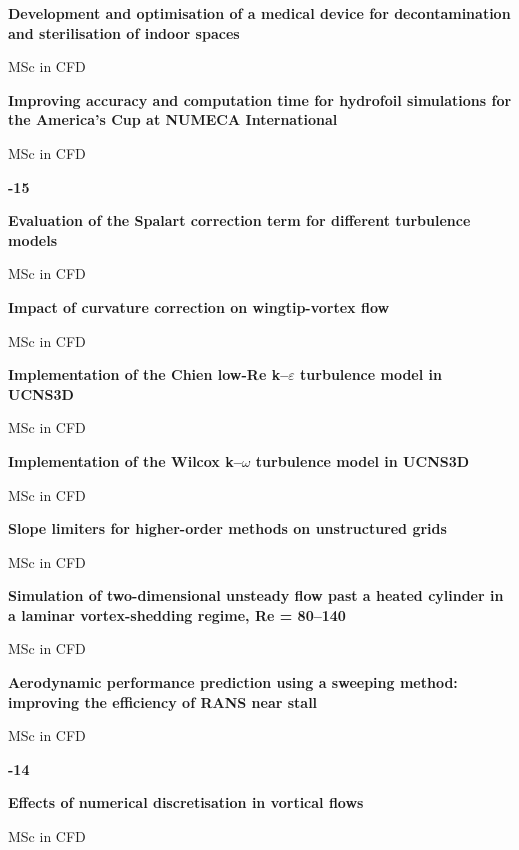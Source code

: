 \documentclass[11pt,a4paper]{article}
\newlength{\cventrysep}
\newenvironment{cventry}{%
  \par\noindent\begin{minipage}{\linewidth}
  \RaggedRight\fontsize{9.8}{12.5}\selectfont
}{\end{minipage}\par\addvspace{\cventrysep}}
\newcommand{\cvtitle}[1]{{\bfseries #1\par}\vspace{1pt}}
\newcommand{\cvmeta}[1]{{\fontsize{9}{11.5}\selectfont\color{Muted}#1\par}\vspace{1pt}}
\newcommand{\cvyear}[1]{{\color{Teal}\bfseries\fontsize{11}{13}\selectfont #1\par}\vspace{6pt}}
\begin{document}
\begin{cventry}
\cvtitle{Development and optimisation of a medical device for decontamination and sterilisation of indoor spaces}
\cvmeta{MSc in CFD}
\end{cventry}

\begin{cventry}
\cvtitle{Improving accuracy and computation time for hydrofoil simulations for the America's Cup at NUMECA International}
\cvmeta{MSc in CFD}
\end{cventry}

\begin{cventry}
\cvyear{2014-15}
\cvtitle{Evaluation of the Spalart correction term for different turbulence models}
\cvmeta{MSc in CFD}
\end{cventry}

\begin{cventry}
\cvtitle{Impact of curvature correction on wingtip-vortex flow}
\cvmeta{MSc in CFD}
\end{cventry}

\begin{cventry}
\cvtitle{Implementation of the Chien low-Re k--\ensuremath{\varepsilon} turbulence model in UCNS3D}
\cvmeta{MSc in CFD}
\end{cventry}

\begin{cventry}
\cvtitle{Implementation of the Wilcox k--\ensuremath{\omega} turbulence model in UCNS3D}
\cvmeta{MSc in CFD}
\end{cventry}

\begin{cventry}
\cvtitle{Slope limiters for higher-order methods on unstructured grids}
\cvmeta{MSc in CFD}
\end{cventry}

\begin{cventry}
\cvtitle{Simulation of two-dimensional unsteady flow past a heated cylinder in a laminar vortex-shedding regime, Re = 80--140}
\cvmeta{MSc in CFD}
\end{cventry}

\begin{cventry}
\cvtitle{Aerodynamic performance prediction using a sweeping method: improving the efficiency of RANS near stall}
\cvmeta{MSc in CFD}
\end{cventry}

\begin{cventry}
\cvyear{2013-14}
\cvtitle{Effects of numerical discretisation in vortical flows}
\cvmeta{MSc in CFD}
\end{cventry}
\end{document}
